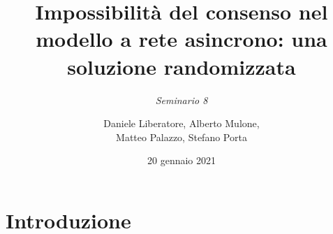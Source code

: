 \documentclass{beamer}
\title[Seminario 8]{\textbf{Impossibilità del consenso nel modello a rete asincrono: una soluzione randomizzata}}
\subtitle{\scriptsize \textit{Seminario 8}}
\author[Liberatore, Mulone, Palazzo, Porta]{Daniele Liberatore, Alberto Mulone, \\ Matteo Palazzo, Stefano Porta}
\institute[]{Università degli Studi di Torino}
\date{20 gennaio 2021}
\begin{document}
{
    \beamertemplatenavigationsymbolsempty
    \begin{frame}
        \titlepage
    \end{frame}
    \addtocounter{framenumber}{-1}
}

    \section{Introduzione}
\end{document}
